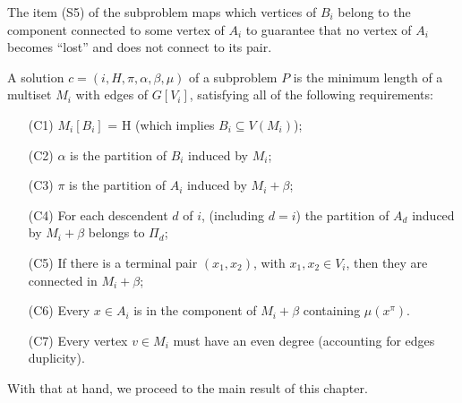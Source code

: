 The item (S5) of the subproblem maps which vertices of \(B_i\) belong to the component connected to some vertex of \(A_i\) to guarantee that no vertex of \(A_i\) becomes ``lost'' and does not connect to its pair.

A solution \(c = (i, H, \pi, \alpha, \beta, \mu)\) of a subproblem \(P\) is the minimum length of a multiset \(M_i\) with edges of \(G[V_i]\), satisfying all of the following requirements:

\begin{itemize}
    \item[(C1)] \(M_i[B_i]\) = H (which implies \(B_i \subseteq V(M_i)\));
    \item[(C2)] \(\alpha\) is the partition of \(B_i\) induced by \(M_i\);
    \item[(C3)] \(\pi\) is the partition of \(A_i\) induced by \(M_i + \beta\);
    \item[(C4)] For each descendent \(d\) of \(i\), (including \(d = i\)) the partition of \(A_d\) induced by \(M_i + \beta\) belongs to \(\Pi_d\);
    \item[(C5)] If there is a terminal pair \((x_1, x_2)\), with \(x_1, x_2 \in V_i\), then they are connected in \(M_i + \beta\);
    \item[(C6)] Every \(x \in A_i\) is in the component of \(M_i + \beta\) containing \(\mu(x^\pi)\).
    \item[(C7)] Every vertex \(v \in M_i\) must have an even degree (accounting for edges duplicity).
\end{itemize}

With that at hand, we proceed to the main result of this chapter.

